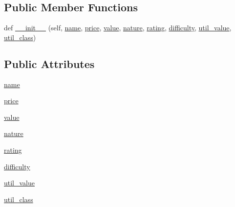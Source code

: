\subsection*{Public Member Functions}
\begin{DoxyCompactItemize}
\item 
def \hyperlink{classgifts_1_1gift__uninherited_1_1_gift_a78eaebfe6b720d93b8ae2d475a6dd613}{\+\_\+\+\_\+init\+\_\+\+\_\+} (self, \hyperlink{classgifts_1_1gift__uninherited_1_1_gift_abe76c25355d683ddd1e2383f139e4f8e}{name}, \hyperlink{classgifts_1_1gift__uninherited_1_1_gift_a0f92afe5566c82745e3b3759d2e9f775}{price}, \hyperlink{classgifts_1_1gift__uninherited_1_1_gift_aea65e2d06b96ec3ab267e4e8dd1e91ff}{value}, \hyperlink{classgifts_1_1gift__uninherited_1_1_gift_ac21294038fa6ce0cd1a192e303fc1920}{nature}, \hyperlink{classgifts_1_1gift__uninherited_1_1_gift_ae4594046255e648f0496354d1eb540ce}{rating}, \hyperlink{classgifts_1_1gift__uninherited_1_1_gift_ae679bef0b9d26aad227c52602b8575ee}{difficulty}, \hyperlink{classgifts_1_1gift__uninherited_1_1_gift_a640df8d6eb45f9027260eb8053bb6b43}{util\+\_\+value}, \hyperlink{classgifts_1_1gift__uninherited_1_1_gift_a7fd2164d8bd791fa524e82d2ef6316aa}{util\+\_\+class})
\end{DoxyCompactItemize}
\subsection*{Public Attributes}
\begin{DoxyCompactItemize}
\item 
\hyperlink{classgifts_1_1gift__uninherited_1_1_gift_abe76c25355d683ddd1e2383f139e4f8e}{name}
\item 
\hyperlink{classgifts_1_1gift__uninherited_1_1_gift_a0f92afe5566c82745e3b3759d2e9f775}{price}
\item 
\hyperlink{classgifts_1_1gift__uninherited_1_1_gift_aea65e2d06b96ec3ab267e4e8dd1e91ff}{value}
\item 
\hyperlink{classgifts_1_1gift__uninherited_1_1_gift_ac21294038fa6ce0cd1a192e303fc1920}{nature}
\item 
\hyperlink{classgifts_1_1gift__uninherited_1_1_gift_ae4594046255e648f0496354d1eb540ce}{rating}
\item 
\hyperlink{classgifts_1_1gift__uninherited_1_1_gift_ae679bef0b9d26aad227c52602b8575ee}{difficulty}
\item 
\hyperlink{classgifts_1_1gift__uninherited_1_1_gift_a640df8d6eb45f9027260eb8053bb6b43}{util\+\_\+value}
\item 
\hyperlink{classgifts_1_1gift__uninherited_1_1_gift_a7fd2164d8bd791fa524e82d2ef6316aa}{util\+\_\+class}
\end{DoxyCompactItemize}


